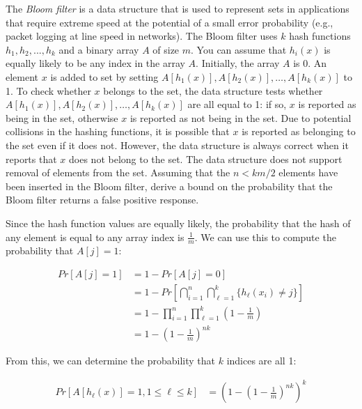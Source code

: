 \documentclass[fleqn]{homework}
\begin{document}
  \begin{problem}{2}
    \begin{question}
      The \textit{Bloom filter} is a data structure that is used to represent
      sets in applications that require extreme speed at the potential of a
      small error probability (e.g., packet logging at line speed in
      networks). The Bloom filter uses $k$ hash functions $h_1, h_2, ..., h_k$
      and a binary array $A$ of size $m$. You can assume that $h_i(x)$ is
      equally likely to be any index in the array $A$. Initially, the array $A$
      is 0. An element $x$ is added to set by setting
      $A[h_1(x)], A[h_2(x)], \dots, A[h_k(x)]$ to 1. To check whether $x$
      belongs to the set, the data structure tests whether
      $A[h_1(x)], A[h_2(x)], \dots, A[h_k(x)]$ are all equal to 1: if so, $x$ is
      reported as being in the set, otherwise $x$ is reported as not being in
      the set. Due to potential collisions in the hashing functions, it is
      possible that $x$ is reported as belonging to the set even if it does
      not. However, the data structure is always correct when it reports that
      $x$ does not belong to the set. The data structure does not support
      removal of elements from the set. Assuming that the $n<km/2$ elements have
      been inserted in the Bloom filter, derive a bound on the probability that
      the Bloom filter returns a false positive response.
    \end{question}

    Since the hash function values are equally likely, the probability that the
    hash of any element is equal to any array index is $\frac{1}{m}$.  We can
    use this to compute the probability that $A[j] = 1$:

    \begin{align*}
      Pr[A[j] = 1] &= 1 - Pr[A[j] = 0] \\
                   &= 1 - Pr\left[\bigcap_{i=1}^n \bigcap_{\ell=1}^k \{h_\ell(x_i) \ne j\}\right] \\
                   &= 1 - \prod_{i=1}^n \prod_{\ell=1}^k \left(1 - \frac{1}{m}\right) \\
                   &= 1 - \left(1 - \frac{1}{m}\right)^{nk}
    \end{align*}

    From this, we can determine the probability that $k$ indices are all 1:

    \begin{align*}
      Pr[A[h_\ell(x)] = 1, 1 \le \ell \le k] &= \left(1 - \left(1 - \frac{1}{m}\right)^{nk}\right)^k
    \end{align*}


\end{problem}
\end{document}
